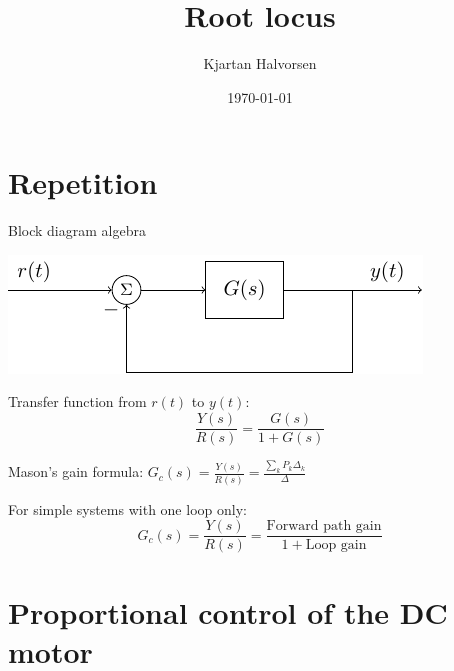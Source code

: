 \documentclass[presentation,aspectratio=169, usenames, dvipsnames]{beamer}
\author{Kjartan Halvorsen}
\date{\today}
\title{Root locus}
\begin{document}
\maketitle


\section{Repetition}
\label{sec:orga63d90e}
\begin{frame}[label={sec:org1804cac}]{Block diagram algebra}
\begin{center}
  \includegraphics[width=.6\linewidth]{../../figures/block-simple-feedback}
\end{center}

Transfer function from \(r(t)\) to \(y(t)\):
\[ \frac{Y(s)}{R(s)} = \frac{G(s)}{ 1+ G(s)}\]

\pause
\alert{Mason's} gain formula: \(G_c(s) = \frac{Y(s)}{R(s)} = \frac{\sum_k P_k\Delta_k}{\Delta}\)

For simple systems with one loop only: \[G_c(s) = \frac{Y(s)}{R(s)} = \frac{\text{Forward path gain}}{1+\text{Loop gain}}\]
\end{frame}



\section{Proportional control of the DC motor}
\label{sec:org59b4eb4}
\end{document}
